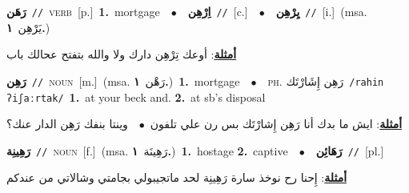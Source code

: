 \documentclass[10pt,a4paper,twoside]{article} %
\begin{document}
\begin{multicols}{2}
{\setlength\topsep{0pt}\textbf{\foreignlanguage{arabic}{رَهَن}}\ {\color{gray}\texttt{//}\color{black}}\ \textsc{verb}\ [p.]\ \textbf{1.}~mortgage\ \ $\bullet$\ \ \setlength\topsep{0pt}\textbf{\foreignlanguage{arabic}{اِرْهِن}}\ {\color{gray}\texttt{//}\color{black}}\ [c.]\ \ $\bullet$\ \ \setlength\topsep{0pt}\textbf{\foreignlanguage{arabic}{يِرْهِن}}\ {\color{gray}\texttt{//}\color{black}}\ [i.]\ \color{gray}(msa. \foreignlanguage{arabic}{يَرْهِن}~\foreignlanguage{arabic}{\textbf{١.}})\color{black}\  \begin{flushright}\color{gray}\foreignlanguage{arabic}{\textbf{\underline{\foreignlanguage{arabic}{أمثلة}}}: أوعك تِرْهِن دارك ولا والله بتفتح عحالك باب}\end{flushright}\color{black}} \vspace{2mm}

{\setlength\topsep{0pt}\textbf{\foreignlanguage{arabic}{رَهِن}}\ {\color{gray}\texttt{//}\color{black}}\ \textsc{noun}\ [m.]\ \color{gray}(msa. \foreignlanguage{arabic}{رَهْن}~\foreignlanguage{arabic}{\textbf{١.}})\color{black}\ \textbf{1.}~mortgage\ \ $\bullet$\ \ \textsc{ph.} \color{gray} \foreignlanguage{arabic}{رَهِن إِشَارْتَك}\color{black}\ {\color{gray}\texttt{/{\sffamily rahin ʔiʃaːrtak}/}\color{black}}\ \textbf{1.}~at your beck and.  \textbf{2.}~at sb's disposal\  \begin{flushright}\color{gray}\foreignlanguage{arabic}{\textbf{\underline{\foreignlanguage{arabic}{أمثلة}}}: ايش ما بدك أنا رَهِن إِشارْتَك بس رن علي تلفون\ $\bullet$\ \  وينتا بنفك رَهِن الدار عنك؟}\end{flushright}\color{black}} \vspace{2mm}

{\setlength\topsep{0pt}\textbf{\foreignlanguage{arabic}{رَهِينِة}}\ {\color{gray}\texttt{//}\color{black}}\ \textsc{noun}\ [f.]\ \color{gray}(msa. \foreignlanguage{arabic}{رَهِينَة}~\foreignlanguage{arabic}{\textbf{١.}})\color{black}\ \textbf{1.}~hostage  \textbf{2.}~captive\ \ $\bullet$\ \ \setlength\topsep{0pt}\textbf{\foreignlanguage{arabic}{رَهَائِن}}\ {\color{gray}\texttt{//}\color{black}}\ [pl.]\  \begin{flushright}\color{gray}\foreignlanguage{arabic}{\textbf{\underline{\foreignlanguage{arabic}{أمثلة}}}: إِحنا رح نوخذ سارة رَهِينِة لحد ماتجيبولي بجامتي وشالاتي من عندكم}\end{flushright}\color{black}} \vspace{2mm}


\end{multicols}
\end{document}
